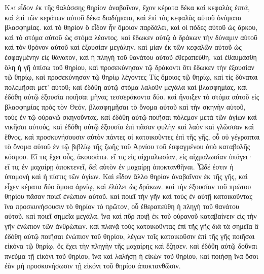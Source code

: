 \begin{pages}
    \begin{Rightside}
        \beginnumbering
		\renewcommand{\LettrineFontHook}{\PHtitl}
		\lettrine[lines=3]{Κ}{αὶ} εἶδον ἐκ τῆς θαλάσσης θηρίον ἀναβαῖνον, ἔχον κέρατα δέκα καὶ κεφαλὰς ἑπτά, καὶ ἐπὶ τῶν κεράτων αὐτοῦ δέκα διαδήματα, καὶ ἐπὶ τὰς κεφαλὰς αὐτοῦ ὀνόματα βλασφημίας. καὶ τὸ θηρίον ὃ εἶδον ἦν ὅμοιον παρδάλει, καὶ οἱ πόδες αὐτοῦ ὡς ἄρκου, καὶ τὸ στόμα αὐτοῦ ὡς στόμα λέοντος. καὶ ἔδωκεν αὐτῷ ὁ δράκων τὴν δύναμιν αὐτοῦ καὶ τὸν θρόνον αὐτοῦ καὶ ἐξουσίαν μεγάλην. 
		\pend
		\pstart
		καὶ μίαν ἐκ τῶν κεφαλῶν αὐτοῦ ὡς ἐσφαγμένην εἰς θάνατον, καὶ ἡ πληγὴ τοῦ θανάτου αὐτοῦ ἐθεραπεύθη. καὶ ἐθαυμάσθη ὅλη ἡ γῆ ὀπίσω τοῦ θηρίου, καὶ προσεκύνησαν τῷ δράκοντι ὅτι ἔδωκεν τὴν ἐξουσίαν τῷ θηρίῳ, καὶ προσεκύνησαν τῷ θηρίῳ λέγοντες Τίς ὅμοιος τῷ θηρίῳ, καὶ τίς δύναται πολεμῆσαι μετ’ αὐτοῦ; 
		\pend
		\pstart
		καὶ ἐδόθη αὐτῷ στόμα λαλοῦν μεγάλα καὶ βλασφημίας, καὶ ἐδόθη αὐτῷ ἐξουσία ποιῆσαι μῆνας τεσσεράκοντα δύο. καὶ ἤνοιξεν τὸ στόμα αὐτοῦ εἰς βλασφημίας πρὸς τὸν Θεόν, βλασφημῆσαι τὸ ὄνομα αὐτοῦ καὶ τὴν σκηνὴν αὐτοῦ, τοὺς ἐν τῷ οὐρανῷ σκηνοῦντας. 
		\pend
		\pstart
		καὶ ἐδόθη αὐτῷ ποιῆσαι πόλεμον μετὰ τῶν ἁγίων καὶ νικῆσαι αὐτούς, καὶ ἐδόθη αὐτῷ ἐξουσία ἐπὶ πᾶσαν φυλὴν καὶ λαὸν καὶ γλῶσσαν καὶ ἔθνος. καὶ προσκυνήσουσιν αὐτὸν πάντες οἱ κατοικοῦντες ἐπὶ τῆς γῆς, οὗ οὐ γέγραπται τὸ ὄνομα αὐτοῦ ἐν τῷ βιβλίῳ τῆς ζωῆς τοῦ Ἀρνίου τοῦ ἐσφαγμένου ἀπὸ καταβολῆς κόσμου. Εἴ τις ἔχει οὖς, ἀκουσάτω. εἴ τις εἰς αἰχμαλωσίαν, εἰς αἰχμαλωσίαν ὑπάγει· εἴ τις ἐν μαχαίρῃ ἀποκτενεῖ, δεῖ αὐτὸν ἐν μαχαίρῃ ἀποκτανθῆναι. Ὧδέ ἐστιν ἡ ὑπομονὴ καὶ ἡ πίστις τῶν ἁγίων. 
		\pend
		\pstart
		Καὶ εἶδον ἄλλο θηρίον ἀναβαῖνον ἐκ τῆς γῆς, καὶ εἶχεν κέρατα δύο ὅμοια ἀρνίῳ, καὶ ἐλάλει ὡς δράκων. καὶ τὴν ἐξουσίαν τοῦ πρώτου θηρίου πᾶσαν ποιεῖ ἐνώπιον αὐτοῦ. καὶ ποιεῖ τὴν γῆν καὶ τοὺς ἐν αὐτῇ κατοικοῦντας ἵνα προσκυνήσουσιν τὸ θηρίον τὸ πρῶτον, οὗ ἐθεραπεύθη ἡ πληγὴ τοῦ θανάτου αὐτοῦ. καὶ ποιεῖ σημεῖα μεγάλα, ἵνα καὶ πῦρ ποιῇ ἐκ τοῦ οὐρανοῦ καταβαίνειν εἰς τὴν γῆν ἐνώπιον τῶν ἀνθρώπων. 
		\pend
		\pstart
		καὶ πλανᾷ τοὺς κατοικοῦντας ἐπὶ τῆς γῆς διὰ τὰ σημεῖα ἃ ἐδόθη αὐτῷ ποιῆσαι ἐνώπιον τοῦ θηρίου, λέγων τοῖς κατοικοῦσιν ἐπὶ τῆς γῆς ποιῆσαι εἰκόνα τῷ θηρίῳ, ὃς ἔχει τὴν πληγὴν τῆς μαχαίρης καὶ ἔζησεν. καὶ ἐδόθη αὐτῷ δοῦναι πνεῦμα τῇ εἰκόνι τοῦ θηρίου, ἵνα καὶ λαλήσῃ ἡ εἰκὼν τοῦ θηρίου, καὶ ποιήσῃ ἵνα ὅσοι ἐὰν μὴ προσκυνήσωσιν τῇ εἰκόνι τοῦ θηρίου ἀποκτανθῶσιν. 

\end{Rightside}
\end{pages}
